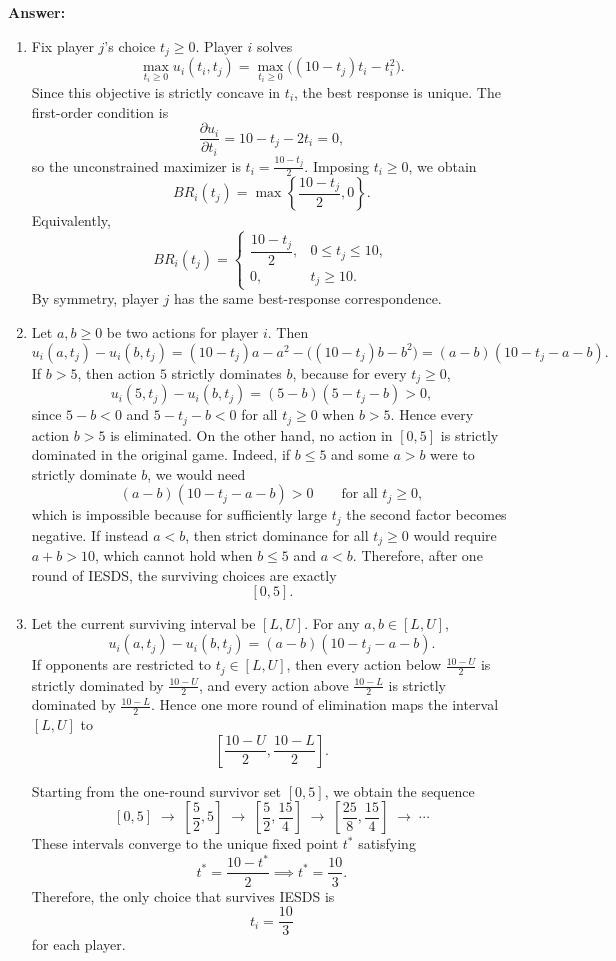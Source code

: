 \documentclass[12pt,a4paper]{article}
\begin{document}
\vspace{0.5cm}

\noindent\textbf{Answer:}
\begin{enumerate}[label=(\alph*)]
  \item Fix player $j$'s choice $t_j\ge 0$. Player $i$ solves
  \[
    \max_{t_i\ge 0} u_i(t_i,t_j)=\max_{t_i\ge 0}\bigl((10-t_j)t_i-t_i^2\bigr).
  \]
  Since this objective is strictly concave in $t_i$, the best response is unique. The first-order condition is
  \[
    \frac{\partial u_i}{\partial t_i}=10-t_j-2t_i=0,
  \]
  so the unconstrained maximizer is $t_i=\frac{10-t_j}{2}$. Imposing $t_i\ge 0$, we obtain
  \[
    BR_i(t_j)=\max\left\{\frac{10-t_j}{2},0\right\}.
  \]
  Equivalently,
  \[
    BR_i(t_j)=
    \begin{cases}
      \dfrac{10-t_j}{2}, & 0\le t_j\le 10,\\[6pt]
      0, & t_j\ge 10.
    \end{cases}
  \]
  By symmetry, player $j$ has the same best-response correspondence.

  \item Let $a,b\ge 0$ be two actions for player $i$. Then
  \[
    u_i(a,t_j)-u_i(b,t_j)
    =(10-t_j)a-a^2-\bigl((10-t_j)b-b^2\bigr)
    =(a-b)(10-t_j-a-b).
  \]
  If $b>5$, then action $5$ strictly dominates $b$, because for every $t_j\ge 0$,
  \[
    u_i(5,t_j)-u_i(b,t_j)=(5-b)(5-t_j-b)>0,
  \]
  since $5-b<0$ and $5-t_j-b<0$ for all $t_j\ge 0$ when $b>5$. Hence every action $b>5$ is eliminated. On the other hand, no action in $[0,5]$ is strictly dominated in the original game. Indeed, if $b\le 5$ and some $a>b$ were to strictly dominate $b$, we would need
  \[
    (a-b)(10-t_j-a-b)>0 \qquad \text{for all } t_j\ge 0,
  \]
  which is impossible because for sufficiently large $t_j$ the second factor becomes negative. If instead $a<b$, then strict dominance for all $t_j\ge 0$ would require $a+b>10$, which cannot hold when $b\le 5$ and $a<b$. Therefore, after one round of IESDS, the surviving choices are exactly
  \[
    [0,5].
  \]

  \item Let the current surviving interval be $[L,U]$. For any $a,b\in [L,U]$,
  \[
    u_i(a,t_j)-u_i(b,t_j)=(a-b)(10-t_j-a-b).
  \]
  If opponents are restricted to $t_j\in [L,U]$, then every action below $\frac{10-U}{2}$ is strictly dominated by $\frac{10-U}{2}$, and every action above $\frac{10-L}{2}$ is strictly dominated by $\frac{10-L}{2}$. Hence one more round of elimination maps the interval $[L,U]$ to
  \[
    \left[\frac{10-U}{2},\frac{10-L}{2}\right].
  \]

  Starting from the one-round survivor set $[0,5]$, we obtain the sequence
  \[
    [0,5]\;\to\;\left[\frac52,5\right]\;\to\;\left[\frac52,\frac{15}{4}\right]\;\to\;\left[\frac{25}{8},\frac{15}{4}\right]\;\to\;\cdots
  \]
  These intervals converge to the unique fixed point $t^*$ satisfying
  \[
    t^*=\frac{10-t^*}{2} \implies t^*=\frac{10}{3}.
  \]
  Therefore, the only choice that survives IESDS is
  \[
    t_i=\frac{10}{3}
  \]
  for each player.
\end{enumerate}
\end{document}
